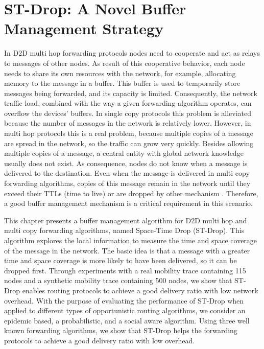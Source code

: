 \chapter{ST-Drop: A Novel Buffer Management Strategy}
\label{ch:StDrop}

In D2D multi hop forwarding protocols nodes need to cooperate and act as relays to messages of other nodes. As result of this cooperative behavior,
each node needs to share its own resources with the network, for example, allocating memory to the message in a buffer. This buffer is used to temporarily
store messages being forwarded, and its capacity is limited. Consequently, the network traffic load, combined with the way a given forwarding algorithm operates,
can overflow the devices’ buffers. In single copy protocols this problem is alleviated because the number of messages in the network is relatively lower. However,
in multi hop protocols this is a real problem, because multiple copies of a message are spread in the network, so the traffic can grow very quickly. Besides allowing
multiple copies of a message, a central entity with global network knowledge usually does not exist. As consequence, nodes do not know when a message is delivered to the destination.
Even when the message is delivered in multi copy forwarding algorithms, copies of this message remain in the network until they exceed their TTLs (time to live)
or are dropped by other mechanism \cite{bindra2012need}. Therefore, a good buffer management mechanism is a critical requirement in this scenario.

This chapter presents a buffer management algorithm for D2D multi hop and multi copy forwarding algorithms, named Space-Time Drop (ST-Drop). This algorithm explores the local
information to measure the time and space coverage of the message in the network. The basic idea is that a message with a greater time and space coverage is more likely to have
been delivered, so it can be dropped first. Through experiments with a real mobility trace containing 115 nodes and a synthetic mobility trace containing 500 nodes,
we show that ST-Drop enables routing protocols to achieve a good delivery ratio with low network overhead. With the purpose of evaluating the performance of ST-Drop
when applied to different types of opportunistic routing algorithms, we consider an epidemic based, a probabilistic, and a social aware algorithm.
Using three well known forwarding algorithms, we show that ST-Drop helps the forwarding protocols to achieve a good delivery ratio with low overhead.

